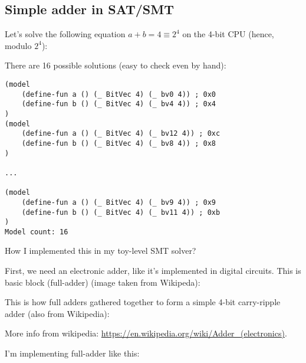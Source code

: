 \subsection{Simple adder in SAT/SMT}

Let's solve the following equation $a+b=4 \equiv 2^4$ on the 4-bit CPU (hence, modulo $2^4$):



There are 16 possible solutions (easy to check even by hand):

\begin{lstlisting}
(model
	(define-fun a () (_ BitVec 4) (_ bv0 4)) ; 0x0
	(define-fun b () (_ BitVec 4) (_ bv4 4)) ; 0x4
)
(model
	(define-fun a () (_ BitVec 4) (_ bv12 4)) ; 0xc
	(define-fun b () (_ BitVec 4) (_ bv8 4)) ; 0x8
)

...

(model
	(define-fun a () (_ BitVec 4) (_ bv9 4)) ; 0x9
	(define-fun b () (_ BitVec 4) (_ bv11 4)) ; 0xb
)
Model count: 16
\end{lstlisting}

How I implemented this in my toy-level SMT solver?

First, we need an electronic adder, like it's implemented in digital circuits.
This is basic block (full-adder) (image taken from Wikipeda):

\begin{figure}[H]
\centering
{}
\end{figure}

This is how full adders gathered together to form a simple 4-bit carry-ripple adder (also from Wikipedia):

\begin{figure}[H]
\centering
{}
\end{figure}

More info from wikipedia: \url{https://en.wikipedia.org/wiki/Adder_(electronics)}.

I'm implementing full-adder like this:

